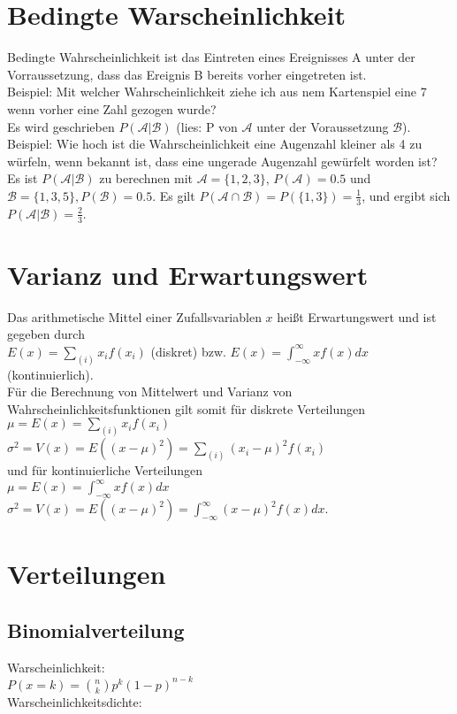 \documentclass[a4paper, 11pt]{article}
\begin{document}
\section{Bedingte Warscheinlichkeit}
Bedingte Wahrscheinlichkeit ist das Eintreten eines Ereignisses A unter der
Vorraussetzung, dass das Ereignis B bereits vorher eingetreten ist. \\
Beispiel: Mit welcher Wahrscheinlichkeit ziehe ich aus nem Kartenspiel eine 7
wenn vorher eine Zahl gezogen wurde? \\
Es wird geschrieben $P(\mathcal{A}|\mathcal{B})$ (lies: P von $\mathcal{A}$
unter der Voraussetzung $\mathcal{B}$). \\
Beispiel: Wie hoch ist die Wahrscheinlichkeit eine Augenzahl kleiner als 4 zu
würfeln, wenn bekannt ist, dass eine ungerade Augenzahl gewürfelt worden ist? \\
Es ist $P(\mathcal{A}|\mathcal{B})$ zu berechnen mit $\mathcal{A} = \{1,2,3\}$,
$P(\mathcal{A})= 0.5$ und $\mathcal{B} = \{ 1,3,5\},
P(\mathcal{B})=0.5$.
Es gilt $P(\mathcal{A}\cap \mathcal{B}) = P(\{ 1,3\}) =
\frac{1}{3}$, und ergibt sich $P(\mathcal{A}|\mathcal{B})= \frac{2}{3}$.
\section{Varianz und Erwartungswert}
Das arithmetische Mittel einer Zufallsvariablen $x$ heißt Erwartungswert und ist
gegeben durch \\
$E(x)=\sum\limits_{(i)}x_if(x_i)$ (diskret) bzw. $E(x) =
\int_{-\infty}^{\infty}xf(x)dx$ (kontinuierlich). \\
Für die Berechnung von Mittelwert und Varianz von Wahrscheinlichkeitsfunktionen
gilt somit für diskrete Verteilungen \\
$\mu = E(x)=\sum\limits_{(i)}x_if(x_i)$ \\
$\sigma^2 = V(x)=E((x-\mu)^2) = \sum\limits_{(i)}(x_i-\mu)^2f(x_i)$ \\ 
und für kontinuierliche Verteilungen \\
$\mu = E(x)=\int_{-\infty}^{\infty}xf(x)dx$ \\
$\sigma^2 = V(x) = E((x-\mu)^2) = \int_{-\infty}^{\infty}(x-\mu)^2f(x)dx$.
\section{Verteilungen}
\subsection{Binomialverteilung}
Warscheinlichkeit:\\
$P(x=k) = \binom{n}{k} p^k (1-p)^{n-k}$ \\
Warscheinlichkeitsdichte:
\end{document}
